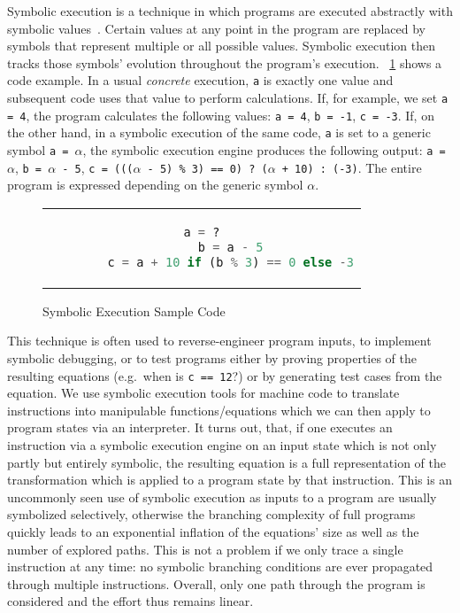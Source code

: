 Symbolic execution is a technique in which programs are executed abstractly with symbolic values~\cite{Steinhöfel2022}.
Certain values at any point in the program are replaced by symbols that represent multiple or all possible values.
Symbolic execution then tracks those symbols' evolution throughout the program's execution.
\lstlistingname~\ref{fig:symbexec_example_listing} shows a code example. In a usual \textit{concrete} execution,
\texttt{a} is exactly one value and subsequent code uses that value to perform calculations. If, for example, we set
\texttt{a = 4}, the program calculates the following values: \texttt{a = 4}, \texttt{b = -1}, \texttt{c = -3}. If, on
the other hand, in a symbolic execution of the same code, \texttt{a} is set to a generic symbol \texttt{a = $\alpha$},
the symbolic execution engine produces the following output: \texttt{a = $\alpha$}, \texttt{b = $\alpha$ - 5}, \texttt{c
= ((($\alpha$ - 5) \% 3) == 0) ? ($\alpha$ + 10) : (-3)}. The entire program is expressed depending on the generic
symbol $\alpha$.

\begin{figure}[htbp]
    \centering
    \begin{tabular}{c}
    \begin{lstlisting}[language=Python]
        a = ?
        b = a - 5
        c = a + 10 if (b % 3) == 0 else -3
    \end{lstlisting}
    \end{tabular}
    \caption[Symbolic execution example]{Symbolic Execution Sample Code}\label{fig:symbexec_example_listing}
\end{figure}


This technique is often used to reverse-engineer program inputs, to implement symbolic debugging, or to test programs
either by proving properties of the resulting equations (e.g.\ when is \texttt{c == 12}?) or by generating test cases
from the equation. We use symbolic execution tools for machine code to translate instructions into manipulable
functions/equations which we can then apply to program states via an interpreter. It turns out, that, if one executes an
instruction via a symbolic execution engine on an input state which is not only partly but entirely symbolic, the
resulting equation is a full representation of the transformation which is applied to a program state by that
instruction. This is an uncommonly seen use of symbolic execution as inputs to a program are usually symbolized
selectively, otherwise the branching complexity of full programs quickly leads to an exponential inflation of the
equations' size as well as the number of explored paths. This is not a problem if we only trace a single instruction at
any time: no symbolic branching conditions are ever propagated through multiple instructions. Overall, only one path
through the program is considered and the effort thus remains linear.

